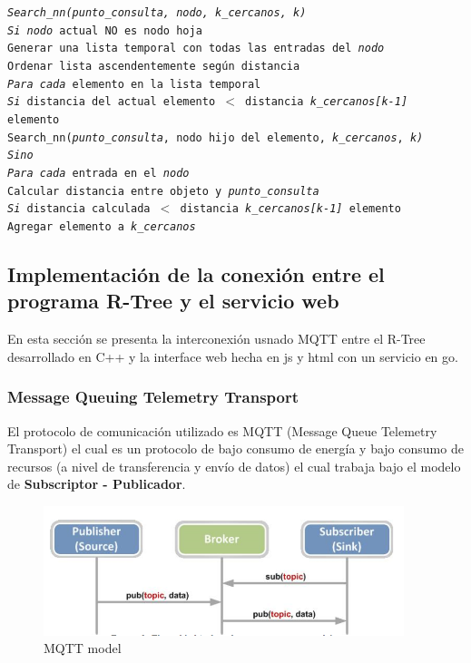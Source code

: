 \documentclass[a4paper]{article}
\newcommand\tab[1][0.5cm]{\hspace*{#1}}
\begin{document}
\texttt{\textit{Search\_nn(punto\_consulta, nodo, k\_cercanos, k)}}\\
\tab \texttt{\textit{Si } \textit{nodo} actual NO es nodo hoja }\\
\tab \tab \texttt{Generar una lista temporal con todas las entradas del \textit{nodo}}\\
\tab \tab \texttt{Ordenar lista ascendentemente según distancia}\\
\tab \tab \texttt{\textit{Para cada} elemento en la lista temporal}\\
\tab \tab\tab \texttt{\textit{Si } distancia del actual elemento  $ < $  distancia \textit{k\_cercanos[k-1]} elemento}\\
\tab \tab\tab\tab \texttt{Search\_nn(\textit{punto\_consulta}, nodo hijo del elemento, \textit{k\_cercanos}, \textit{k)} }\\
\tab \texttt{\textit{Sino}} \\
\tab \tab \texttt{\textit{Para cada} entrada en el \textit{nodo}}\\
\tab \tab\tab \texttt{Calcular distancia entre objeto y \textit{punto\_consulta}}\\
\tab \tab\tab \texttt{\textit{Si } distancia calculada $ < $ distancia \textit{k\_cercanos[k-1]} elemento }\\
\tab \tab\tab\tab \texttt{Agregar elemento a \textit{k\_cercanos }}\\

\subsection{Implementación de la conexión entre el programa R-Tree y el servicio web} %

En esta sección se presenta la interconexión usnado MQTT entre el R-Tree desarrollado en C++ y la interface web hecha en js y html con un servicio en go.

\subsubsection{Message Queuing Telemetry Transport}

El protocolo de comunicación utilizado es MQTT (Message Queue Telemetry Transport) \cite{mqtt} el cual es un protocolo de bajo consumo de energía y bajo consumo de recursos (a nivel de transferencia y envío de datos) el cual trabaja bajo el modelo de \textbf{Subscriptor - Publicador}.

\begin{figure}[ht]
\centering
  \includegraphics[width=10.5cm]{images/model.png}
  \caption{MQTT model}
  \label{fig1}
\end{figure}
\end{document}
